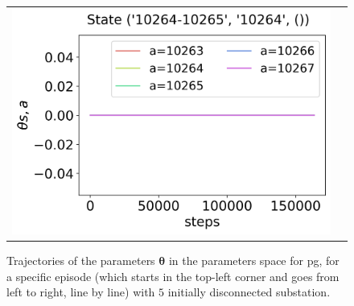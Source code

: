 \begin{figure}[!htp]
\begin{tabular}{cc}
        \hspace*{-28pt}\includegraphics[scale=0.36,valign=b]{chapters/figures/theta_PG_state_3.png}
    \end{tabular}
    \caption{\small Trajectories of the parameters $\boldsymbol \theta$ in the parameters space for \acrshort{pg}, for a specific episode (which starts in the top-left corner and goes from left to right, line by line) with $5$ initially disconnected substation.}
    \label{fig:sequence-theta-pg}
\end{figure}

